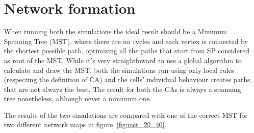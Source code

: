 \section{Network formation}
\label{network_formation}

When running both the simulations the ideal result should be a Minimum Spanning Tree (MST), where there are no cycles and each vertex is connected by the shortest possible path, optimizing all the paths that start from SP considered as root of the MST.
While it's very straightfoward to use a global algorithm to calculate and draw the MST, both the simulations run using only local rules (respecting the definition of CA) and the cells' individual behaviour creates paths that are not always the best. The result for both the CAs is always a spanning tree nonetheless, although never a minimum one.

\par
The results of the two simulations are compared with one of the correct MST for two different network maps in figure~\ref{fig:mst_20_40}.

